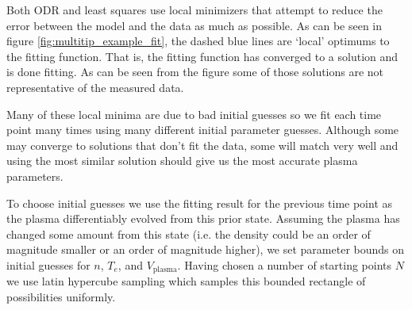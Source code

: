 Both ODR and least squares use local minimizers that attempt to reduce the error between the model and the data as much as possible. As can be seen in figure \ref{fig:multitip_example_fit}, the dashed blue lines are `local' optimums to the fitting function. That is, the fitting function has converged to a solution and is done fitting. As can be seen from the figure some of those solutions are not representative of the measured data.


Many of these local minima are due to bad initial guesses so we fit each time point many times using many different initial parameter guesses. Although some may converge to solutions that don't fit the data, some will match very well and using the most similar solution should give us the most accurate plasma parameters.


To choose initial guesses we use the fitting result for the previous time point as the plasma differentiably evolved from this prior state. Assuming the plasma has changed some amount from this state (i.e. the density could be an order of magnitude smaller or an order of magnitude higher), we set parameter bounds on initial guesses for $n$, $T_e$, and $V_\text{plasma}$. Having chosen a number of starting points $N$ we use latin hypercube sampling which samples this bounded rectangle of possibilities uniformly.




